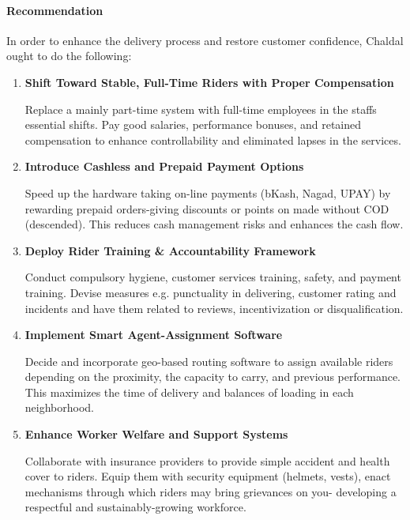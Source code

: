 \documentclass[12pt,a4paper]{article}
\begin{document}
\paragraph{Recommendation}

In order to enhance the delivery process and restore customer confidence, Chaldal ought to do the following:

\begin{enumerate}
    \item \textbf{Shift Toward Stable, Full-Time Riders with Proper Compensation}
    
    Replace a mainly part-time system with full-time employees in the staffs essential shifts. Pay good salaries, performance bonuses, and retained compensation to enhance controllability and eliminated lapses in the services.
    
    \item \textbf{Introduce Cashless and Prepaid Payment Options}
    
    Speed up the hardware taking on-line payments (bKash, Nagad, UPAY) by rewarding prepaid orders-giving discounts or points on made without COD (descended). This reduces cash management risks and enhances the cash flow.
    
    \item \textbf{Deploy Rider Training \& Accountability Framework}
    
    Conduct compulsory hygiene, customer services training, safety, and payment training. Devise measures e.g. punctuality in delivering, customer rating and incidents and have them related to reviews, incentivization or disqualification.
    
    \item \textbf{Implement Smart Agent-Assignment Software}
    
    Decide and incorporate geo-based routing software to assign available riders depending on the proximity, the capacity to carry, and previous performance. This maximizes the time of delivery and balances of loading in each neighborhood.
    
    \item \textbf{Enhance Worker Welfare and Support Systems}
    
    Collaborate with insurance providers to provide simple accident and health cover to riders. Equip them with security equipment (helmets, vests), enact mechanisms through which riders may bring grievances on you- developing a respectful and sustainably-growing workforce.
\end{enumerate}
\end{document}

